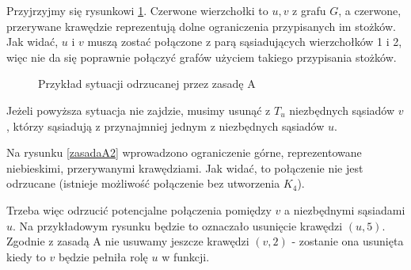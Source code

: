Przyjrzyjmy się rysunkowi \ref{zasadaA1}. Czerwone wierzchołki to $u, v$ z grafu $G$, 
a czerwone, przerywane krawędzie reprezentują dolne ograniczenia przypisanych im stożków.
Jak widać, $u$ i $v$ muszą zostać połączone z parą sąsiadujących wierzchołków 1 i 2, więc nie 
da się poprawnie połączyć grafów użyciem takiego przypisania stożków.
\begin{figure}[H]
  \centering
 \caption{Przykład sytuacji odrzucanej przez zasadę A}
 \label{zasadaA1}
 \end{figure}

 Jeżeli powyższa sytuacja nie zajdzie, musimy usunąć z $T_u$ niezbędnych sąsiadów $v$, 
 którzy sąsiadują z przynajmniej jednym z niezbędnych sąsiadów $u$. 
 
  Na rysunku \ref{zasadaA2} wprowadzono ograniczenie górne, reprezentowane niebieskimi, 
  przerywanymi krawędziami.  Jak widać, to połączenie nie jest odrzucane (istnieje możliwość połączenie bez utworzenia $K_4$).
    
  Trzeba więc odrzucić potencjalne połączenia pomiędzy $v$ a niezbędnymi sąsiadami $u$. 
  Na przykładowym rysunku będzie to oznaczało usunięcie krawędzi $(u, 5)$. Zgodnie z zasadą A nie usuwamy jeszcze krawędzi 
  $(v,2)$ - zostanie ona usunięta kiedy to $v$ będzie pełniła rolę $u$ w funkcji.  

